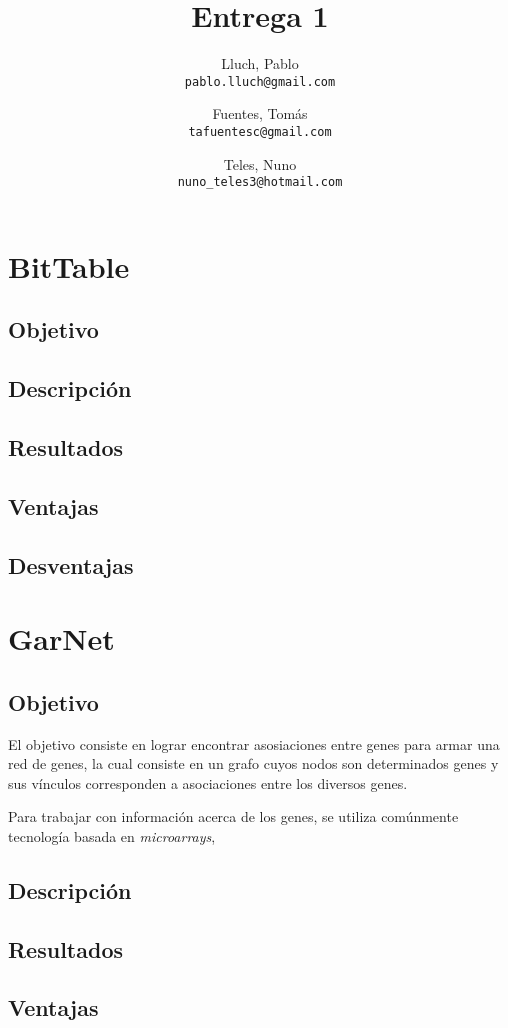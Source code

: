 \documentclass[12pt,spanish]{article}
\title{Entrega 1}
\author{
  Lluch, Pablo\\
  \texttt{pablo.lluch@gmail.com}
  \and
  Fuentes, Tomás\\
  \texttt{tafuentesc@gmail.com}
  \and
  Teles, Nuno\\
  \texttt{nuno\_teles3@hotmail.com}
}
\begin{document}
\maketitle
\newpage

\section{BitTable}

\subsection{Objetivo}
\subsection{Descripción}
\subsection{Resultados}
\subsection{Ventajas}
\subsection{Desventajas}

\section{GarNet}

\subsection{Objetivo}
El objetivo consiste en lograr encontrar asosiaciones entre genes para armar una red de genes, la cual consiste en un grafo cuyos nodos son determinados genes y sus vínculos corresponden a asociaciones entre los diversos genes.

Para trabajar con información acerca de los genes, se utiliza comúnmente tecnología basada en \emph{microarrays}, 
\subsection{Descripción}

\subsection{Resultados}
\subsection{Ventajas}
\end{document}
